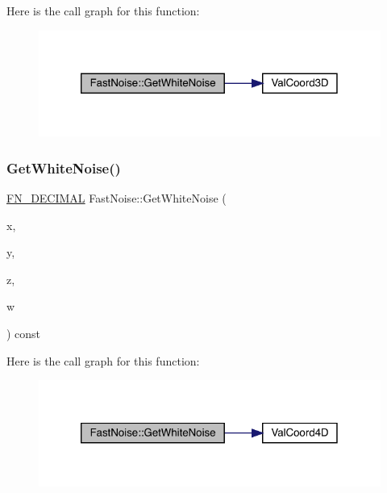 Here is the call graph for this function\+:
\nopagebreak
\begin{figure}[H]
\begin{center}
\leavevmode
\includegraphics[width=320pt]{d1/dd8/class_fast_noise_a661febd01ba99e06b9de5fab9bd13fb0_cgraph}
\end{center}
\end{figure}
\mbox{\label{class_fast_noise_a39fd417e39c49b29e8ab69381c74974d}} 
\subsubsection{\texorpdfstring{Get\+White\+Noise()}{GetWhiteNoise()}\hspace{0.1cm}{\footnotesize\ttfamily [3/3]}}
{\footnotesize\ttfamily \mbox{\hyperlink{_fast_noise_8h_a75a9ef6d2541c4921815b885bfd449c3}{F\+N\+\_\+\+D\+E\+C\+I\+M\+AL}} Fast\+Noise\+::\+Get\+White\+Noise (\begin{DoxyParamCaption}\item[{\mbox{\hyperlink{_fast_noise_8h_a75a9ef6d2541c4921815b885bfd449c3}{F\+N\+\_\+\+D\+E\+C\+I\+M\+AL}}}]{x,  }\item[{\mbox{\hyperlink{_fast_noise_8h_a75a9ef6d2541c4921815b885bfd449c3}{F\+N\+\_\+\+D\+E\+C\+I\+M\+AL}}}]{y,  }\item[{\mbox{\hyperlink{_fast_noise_8h_a75a9ef6d2541c4921815b885bfd449c3}{F\+N\+\_\+\+D\+E\+C\+I\+M\+AL}}}]{z,  }\item[{\mbox{\hyperlink{_fast_noise_8h_a75a9ef6d2541c4921815b885bfd449c3}{F\+N\+\_\+\+D\+E\+C\+I\+M\+AL}}}]{w }\end{DoxyParamCaption}) const}

Here is the call graph for this function\+:
\nopagebreak
\begin{figure}[H]
\begin{center}
\leavevmode
\includegraphics[width=320pt]{d1/dd8/class_fast_noise_a39fd417e39c49b29e8ab69381c74974d_cgraph}
\end{center}
\end{figure}
\mbox{\label{class_fast_noise_a7a9d98438239800363188c7219bb26bc}} 
